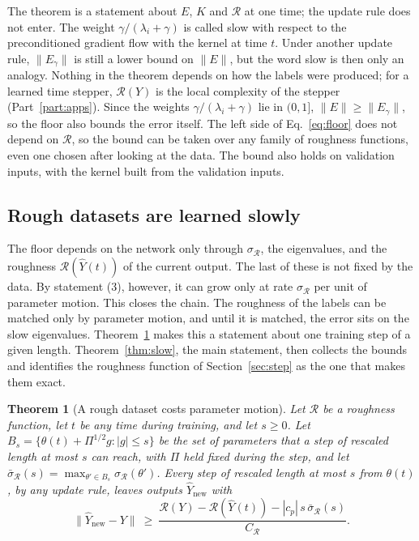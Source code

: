 \documentclass[11pt]{article}
\newtheorem{theorem}{Theorem}
\theoremstyle{definition}
\theoremstyle{remark}
\newcommand{\Rgh}{\mathcal{R}}           %
\newcommand{\sR}{\sigma_{\Rgh}}
\newcommand{\CR}{C_{\Rgh}}
\begin{document}
The theorem is a statement about $E$, $K$ and $\Rgh$ at one time; the update rule does not enter.
The weight $\gamma/(\lambda_i+\gamma)$ is called slow with respect to the preconditioned gradient flow with the kernel at time $t$.
Under another update rule, $\|E_\gamma\|$ is still a lower bound on $\|E\|$, but the word slow is then only an analogy.
Nothing in the theorem depends on how the labels were produced; for a learned time stepper, $\Rgh(Y)$ is the local complexity of the stepper (Part~\ref{part:apps}).
Since the weights $\gamma/(\lambda_i+\gamma)$ lie in $(0,1]$, $\|E\| \ge \|E_\gamma\|$, so the floor also bounds the error itself.
The left side of Eq.~\eqref{eq:floor} does not depend on $\Rgh$, so the bound can be taken over any family of roughness functions, even one chosen after looking at the data.
The bound also holds on validation inputs, with the kernel built from the validation inputs.

\subsection{Rough datasets are learned slowly}\label{sec:slow}

The floor depends on the network only through $\sR$, the eigenvalues, and the roughness $\Rgh(\hat Y(t))$ of the current output.
The last of these is not fixed by the data.
By statement (3), however, it can grow only at rate $\sR$ per unit of parameter motion.
This closes the chain.
The roughness of the labels can be matched only by parameter motion, and until it is matched, the error sits on the slow eigenvalues.
Theorem~\ref{thm:dataset} makes this a statement about one training step of a given length.
Theorem~\ref{thm:slow}, the main statement, then collects the bounds and identifies the roughness function of Section~\ref{sec:step} as the one that makes them exact.

\begin{theorem}[A rough dataset costs parameter motion]\label{thm:dataset}
Let $\Rgh$ be a roughness function, let $t$ be any time during training, and let $s \ge 0$.
Let $B_s = \{\theta(t) + \Pi^{1/2}g : |g| \le s\}$ be the set of parameters that a step of rescaled length at most $s$ can reach, with $\Pi$ held fixed during the step, and let $\bar\sigma_\Rgh(s) = \max_{\theta' \in B_s}\sR(\theta')$.
Every step of rescaled length at most $s$ from $\theta(t)$, by any update rule, leaves outputs $\hat Y_{\mathrm{new}}$ with
\begin{equation}\label{eq:dataset}
\|\hat Y_{\mathrm{new}} - Y\| \ \ge\ \frac{\Rgh(Y) - \Rgh(\hat Y(t)) - |c_p|\,s\,\bar\sigma_\Rgh(s)}{\CR}.
\end{equation}
\end{theorem}
\end{document}
